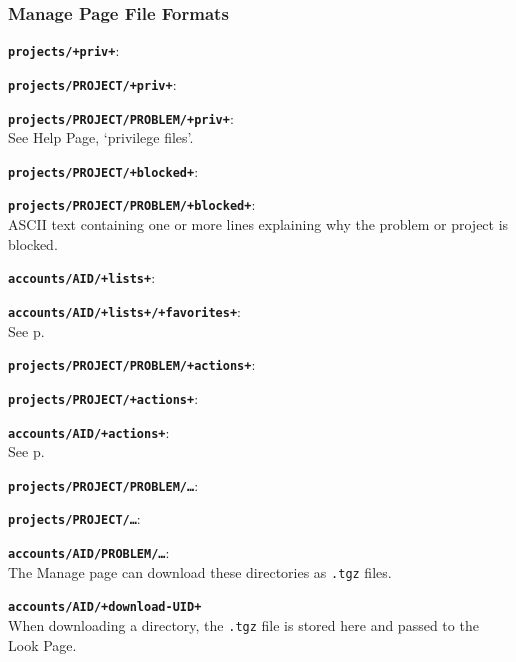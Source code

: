 \documentclass[12pt]{article}
\newenvironment{indpar}[1][0.4in]%
	{\begin{list}{}%
		     {\setlength{\itemsep}{0in}%
		      \setlength{\topsep}{0in}%
		      \setlength{\parsep}{1ex}%
		      \setlength{\labelwidth}{#1}%
		      \setlength{\leftmargin}{#1}%
		      \addtolength{\leftmargin}{\labelsep}}%
	 \item}%
	{\end{list}}
\newenvironment{itemlist}[1][0.2in]%
	{\begin{list}{}{\setlength{\labelwidth}{#1}%
		        \setlength{\leftmargin}{\labelwidth}%
		        \addtolength{\leftmargin}{+0.2in}%
		        \addtolength{\linewidth}{-\labelwidth}%
		        \addtolength{\linewidth}{-0.2in}%
		        \renewcommand{\makelabel}[1]{##1\hfill}}
	 \raggedright}%
	{\end{list}}
\newcommand{\TT}[1]{{\tt \bfseries #1}}
\newcommand{\pagref}[1]{p\pageref{#1}}
\begin{document}
\subsubsection{Manage Page File Formats}

\begin{indpar}
\begin{itemlist}
\item[\TT{projects/+priv+}:]
\item[\TT{projects/PROJECT/+priv+}:]\vspace*{-1ex}~
\item[\TT{projects/PROJECT/PROBLEM/+priv+}:]\vspace*{-1ex}~
\label{PRIV} \\
See Help Page, `privilege files'.
\item[\TT{projects/PROJECT/+blocked+}:]
\item[\TT{projects/PROJECT/PROBLEM/+blocked+}:]\vspace*{-1ex}~
\label{BLOCKED} \\
ASCII text containing one or more lines explaining why the
problem or project is blocked.
\item[\TT{accounts/AID/+lists+}:]
\item[\TT{accounts/AID/+lists+/+favorites+}:]\vspace*{-1ex}~ \\
See \pagref{FAVORITES}.
\item[\TT{projects/PROJECT/PROBLEM/+actions+}:]
\item[\TT{projects/PROJECT/+actions+}:]\vspace*{-1ex}
\item[\TT{accounts/AID/+actions+}:]\vspace*{-1ex}~ \\
See \pagref{ACCOUNT-ACTIONS}.
\item[\TT{projects/PROJECT/PROBLEM/\ldots}:]
\item[\TT{projects/PROJECT/\ldots}:]\vspace*{-1ex}
\item[\TT{accounts/AID/PROBLEM/\ldots}:]\vspace*{-1ex} ~ \\
The Manage page can download these directories as {\tt .tgz} files.
\item[\TT{accounts/AID/+download-UID+}] ~ \\
When downloading a directory, the {\tt .tgz} file is stored
here and passed to the Look Page.

\end{itemlist}
\end{indpar}
\end{document}
